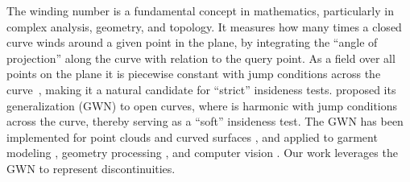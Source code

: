 The winding number is a fundamental concept in mathematics, particularly in complex analysis, geometry, and topology. It measures how many times a closed curve winds around a given point in the plane, by integrating the ``angle of projection'' along the curve with relation to the query point. As a field over all points on the plane it is piecewise constant with jump conditions across the curve~\cite{Reinhart1960TheWN, 10.1145/368637.368653}, making it a natural candidate for ``strict'' insideness tests. \citet{Jacobson:2018:GWN} proposed its generalization (GWN) to open curves, where is harmonic with jump conditions across the curve, thereby serving as a  ``soft'' insideness test. The GWN has been implemented for point clouds \cite{Barill:FW:2018} and curved surfaces \cite{Feng:2023:WND}, and applied to garment modeling \cite{Hu:2018:TMW, chi2021garmentnets}, geometry processing \cite{Rui2023GCNO, Zhou:2016:MASG}, and computer vision \cite{Mueller:CVPR:2021}. 
Our work leverages the GWN to represent discontinuities. 




